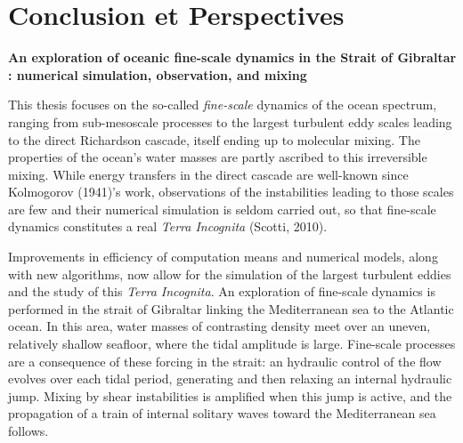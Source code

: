 \documentclass[a4paper,12pt,notitlepage,twoside]{report}
\numberwithin{equation}{section}
\begin{document}



\chapter{Conclusion et Perspectives}



\listoffigures {}


\listoftables {}





\newpage
{}
\thispagestyle{empty}
\begin{center}
\textbf{An exploration of oceanic fine-scale dynamics in the Strait of Gibraltar : numerical simulation, observation, and mixing}
\end{center}
This thesis focuses on the so-called \textit{fine-scale} dynamics of the ocean spectrum, ranging from sub-mesoscale processes to the largest turbulent eddy scales leading to the direct Richardson cascade, itself ending up to molecular mixing. The properties of the ocean's water masses are partly ascribed to this irreversible mixing. While energy transfers in the direct cascade are well-known since Kolmogorov (1941)'s work, observations of the instabilities leading to those scales are few and their numerical simulation is seldom carried out, so that fine-scale dynamics constitutes a real \textit{Terra Incognita} (Scotti, 2010).

Improvements in efficiency of computation means and numerical models, along with new algorithms, now allow for the simulation of the largest turbulent eddies and the study of this \textit{Terra Incognita}. An exploration of fine-scale dynamics is performed in the strait of Gibraltar linking the Mediterranean sea to the Atlantic ocean. In this area, water masses of contrasting density meet over an uneven, relatively shallow seafloor, where the tidal amplitude is large. Fine-scale processes are a consequence of these forcing in the strait: an hydraulic control of the flow evolves over each tidal period, generating and then relaxing an internal hydraulic jump. Mixing by shear instabilities is amplified when this jump is active, and the propagation of a train of internal solitary waves toward the Mediterranean sea follows.
\end{document}
